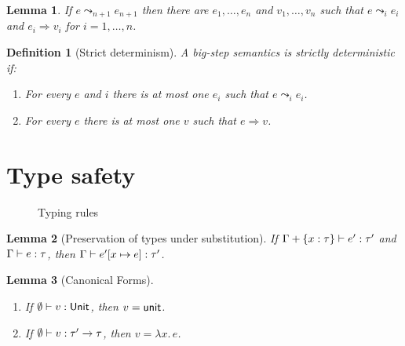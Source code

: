 \documentclass[12pt,a2paper,draft]{article}
\newcommand{\abstr}[2]{\ensuremath{\lambda{#1}.\,{#2}}}
\newcommand{\app}[2]{\ensuremath{{#1}\,{#2}}}
\newcommand{\rec}[2]{\ensuremath{{\normalfont\textsf{rec}}\,{#1}.\,{#2}}}
\newcommand{\unit}{\ensuremath{\normalfont\textsf{unit}}}
\newcommand{\Unit}{\ensuremath{\normalfont\textsf{Unit}}}
\newcommand{\Tj}[3]{\mbox{\ensuremath{{#1}\vdash{#2}:{#3}}}}
\newcommand{\tj}[2]{\Tj{\emptyset}{#1}{#2}}
\newtheorem{lemma}{Lemma}
\newtheorem{definition}{Definition}
\begin{document}
\begin{lemma}
  If $e \leadsto_{n+1} e_{n+1}$ then there are $e_1,\ldots,e_n$ and
  $v_1,\ldots,v_n$ such that $e \leadsto_i e_i$ and $e_i \Rightarrow v_i$
  for $i=1,\ldots,n$.
\end{lemma}

\begin{definition}[Strict determinism]
  A big-step semantics is \emph{strictly deterministic} if:
  \begin{enumerate}
  \item For every $e$ and $i$ there is at most one $e_i$ such that $e \leadsto_i e_i$.
  \item For every $e$ there is at most one $v$ such that $e \Rightarrow v$.
  \end{enumerate}
\end{definition}


\section{Type safety}

\begin{figure}[htb]
  \centering
  \caption{Typing rules}
  \label{figure:Typing_rules}
\end{figure}

\begin{lemma}[Preservation of types under substitution] \label{lemma:Preservation_of_types_under_substitution}
  If $\Tj{\Gamma + \{x:\tau\}}{e'}{\tau'}$ and $\Tj{\Gamma}{e}{\tau}$,
  then $\Tj{\Gamma}{e'[x \mapsto e]}{\tau'}$.
\end{lemma}

\begin{lemma}[Canonical Forms] \label{lemma:Canonical_Forms} \
  \begin{enumerate}
  \item If $\tj{v}{\Unit}$, then $v = \unit$.
  \item If $\tj{v}{\tau' \to \tau}$, then $v = \abstr{x}{e}$.
  \end{enumerate}
\end{lemma}
\end{document}
